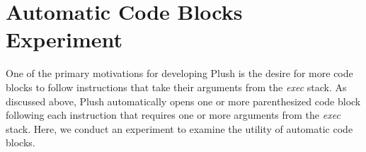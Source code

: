 \documentclass[graybox]{svmult}
\begin{document}










\section{Automatic Code Blocks Experiment}

One of the primary motivations for developing Plush is the desire for more code blocks to follow instructions that take their arguments from the \textit{exec} stack. As discussed above, Plush automatically opens one or more parenthesized code block following each instruction that requires one or more arguments from the \textit{exec} stack. Here, we conduct an experiment to examine the utility of automatic code blocks.
\end{document}

